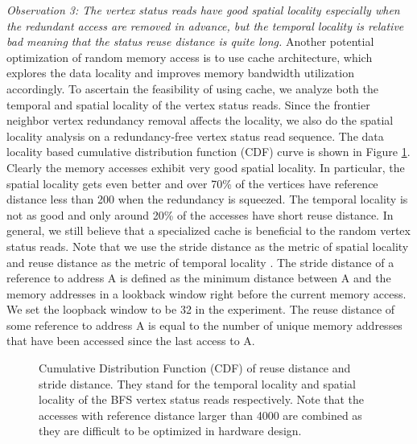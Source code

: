 \textit{Observation 3: The vertex status reads have good 
spatial locality especially when the redundant access are removed in advance, 
but the temporal locality is relative bad meaning that the status reuse 
distance is quite long.}
Another potential optimization of random memory access is to use cache architecture, 
which explores the data locality and improves memory bandwidth utilization 
accordingly. To ascertain the feasibility of using cache, we analyze both the 
temporal and spatial locality of the vertex status reads. Since 
the frontier neighbor vertex redundancy removal affects the locality, 
we also do the spatial locality analysis on a redundancy-free 
vertex status read sequence. The data locality based cumulative 
distribution function (CDF) curve is shown in 
Figure \ref{fig:youtube-locality}. Clearly the memory accesses exhibit 
very good spatial locality. In particular, the spatial 
locality gets even better and over 70\% of the vertices have reference distance 
less than 200 when the redundancy is squeezed. The temporal locality is not as 
good and only around 20\% of the accesses have short reuse distance. In general, 
we still believe that a specialized cache is beneficial to the random 
vertex status reads. Note that we use 
the stride distance as the metric of spatial locality and reuse distance as the metric 
of temporal locality \cite{weinberg2008chameleon}. The stride distance of a reference 
to address A is defined as the minimum distance between A and the 
memory addresses in a lookback window right before the current 
memory access. We set the loopback window to be 32 in the experiment. 
The reuse distance of some reference to 
address A is equal to the number of unique memory addresses that have been 
accessed since the last access to A.  

\begin{figure}
\caption{Cumulative Distribution Function (CDF) of reuse distance 
    and stride distance. They stand for the temporal locality and spatial 
    locality of the BFS vertex status reads respectively. Note that the 
    accesses with reference distance larger than 4000 are combined as they are difficult 
    to be optimized in hardware design.}
\label{fig:youtube-locality}
\end{figure}

